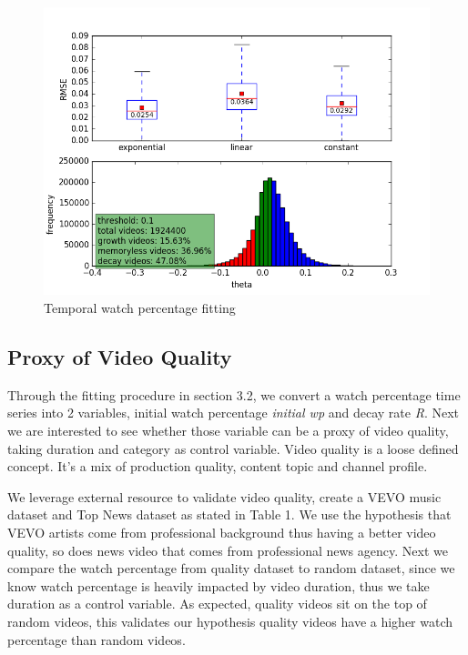 \begin{figure}
    \centering
    \includegraphics[scale=0.45]{image/wp_rmse_comp_and_theta_dist.png}
    \caption{Temporal watch percentage fitting}
\end{figure}

\subsection{Proxy of Video Quality}

Through the fitting procedure in section 3.2, we convert a watch percentage time series into 2 variables, initial watch percentage \textit{initial wp} and decay rate \textit{R}. Next we are interested to see whether those variable can be a proxy of video quality, taking duration and category as control variable. Video quality is a loose defined concept. It's a mix of production quality, content topic and channel profile.

We leverage external resource to validate video quality, create a VEVO music dataset and Top News dataset as stated in Table 1. We use the hypothesis that VEVO artists come from professional background thus having a better video quality, so does news video that comes from professional news agency. Next we compare the watch percentage from quality dataset to random dataset, since we know watch percentage is heavily impacted by video duration, thus we take duration as a control variable. As expected, quality videos sit on the top of random videos, this validates our hypothesis quality videos have a higher watch percentage than random videos.

